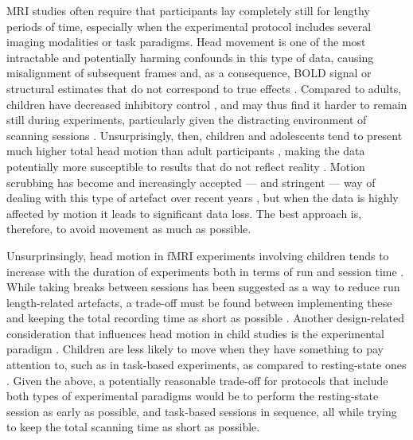 MRI studies often require that participants lay completely still for lengthy periods of time, especially when the experimental protocol includes several imaging modalities or task paradigms. Head movement is one of the most intractable and potentially harming confounds in this type of data, causing misalignment of subsequent frames and, as a consequence, BOLD signal or structural estimates that do not correspond to true effects \citep{Friston1996,Siegel2017}. Compared to adults, children have decreased inhibitory control \citep{Bedard2002}, and may thus find it harder to remain still during experiments, particularly  given the distracting environment of scanning sessions \citep{Greene2016}. Unsurprisingly, then, children and adolescents tend to present much higher total head motion than adult participants \citep{Satterthwaite2013b}, making the data potentially more susceptible to results that do not reflect reality \citep{Power2012}. Motion scrubbing has become and increasingly accepted --- and stringent --- way of dealing with this type of artefact over recent years \citep{Power2014a,Laumann2016}, but when the data is highly affected by motion it leads to significant data loss. The best approach is, therefore, to avoid movement as much as possible.

Unsurprinsingly, head motion in fMRI experiments involving children tends to increase with the duration of experiments both in terms of run and session time \citep{Engelhardt2017}. While taking breaks between sessions has been suggested as a way to reduce run length-related artefacts, a trade-off must be found between implementing these and keeping the total recording time as short as possible \citep{Meissner2019}.  Another design-related consideration that influences head motion in child studies is the experimental paradigm \citep{Yuan2009a}. Children are less likely to move when they have something to pay attention to, such as in task-based experiments, as compared to resting-state ones \citep{Engelhardt2017}. Given the above, a potentially reasonable trade-off for protocols that include both types of experimental paradigms would be to perform the resting-state session as early as possible, and task-based sessions in sequence, all while trying to keep the total scanning time as short as possible. 


